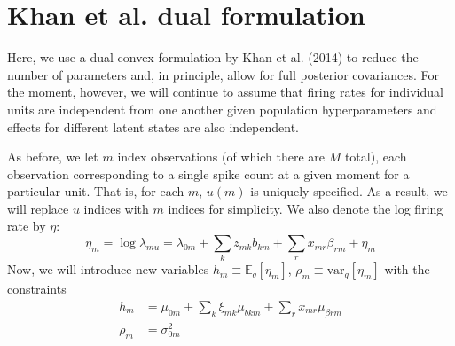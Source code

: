 \documentclass[11pt]{article}
\begin{document}
\section{Khan et al. dual formulation}
Here, we use a dual convex formulation by Khan et al. (2014) to reduce the number of parameters and, in principle, allow for full posterior covariances. For the moment, however, we will continue to assume that firing rates for individual units are independent from one another given population hyperparameters and effects for different latent states are also independent.

As before, we let $m$ index observations (of which there are $M$ total), each observation corresponding to a single spike count at a given moment for a particular unit. That is, for each $m$, $u(m)$ is uniquely specified. As a result, we will replace $u$ indices with $m$ indices for simplicity. We also denote the log firing rate by $\eta$:
\begin{equation}
    \eta_m = \log \lambda_{mu} = \lambda_{0m} + \sum_k z_{mk} b_{k m} + \sum_r x_{mr} \beta_{r m} + \eta_m
\end{equation}
Now, we will introduce new variables $h_m \equiv \mathbb{E}_q[\eta_m]$, $\rho_m \equiv \mathrm{var}_q[\eta_m]$ with the constraints
\begin{align}
    h_m &= \mu_{0m} + \sum_k \xi_{mk} \mu_{bkm} + \sum_r x_{mr} \mu_{\beta rm} \\
    \rho_m &= \sigma^2_{0m} 
\end{align}
\end{document}
